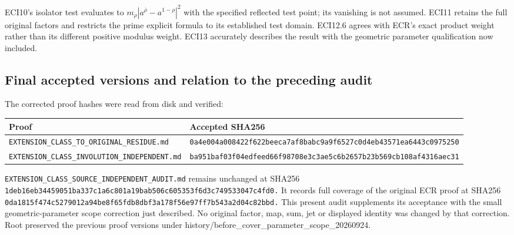 ECI10's isolator test evaluates to
\(m_\rho|a^{\overline\rho}-a^{1-\rho}|^2\) with the specified reflected
test point; its vanishing is not assumed. ECI11 retains the full
original factors and restricts the prime explicit formula to its
established test domain. ECI12.6 agrees with ECR's exact product weight
rather than its different positive modulus weight. ECI13 accurately
describes the result with the geometric parameter qualification now
included.

\subsection{Final accepted versions and relation to the preceding
audit}\label{final-accepted-versions-and-relation-to-the-preceding-audit}

The corrected proof hashes were read from disk and verified:

{\def\LTcaptype{none} %
\begin{longtable}[]{@{}
  >{\raggedright\arraybackslash}p{}
  >{\raggedright\arraybackslash}p{}@{}}
\toprule\noalign{}
\begin{minipage}[b]{\linewidth}\raggedright
Proof
\end{minipage} & \begin{minipage}[b]{\linewidth}\raggedright
Accepted SHA256
\end{minipage} \\
\midrule\noalign{}
\endhead
\bottomrule\noalign{}
\endlastfoot
\nolinkurl{EXTENSION_CLASS_TO_ORIGINAL_RESIDUE.md} &
\nolinkurl{0a4e004a008422f622beeca7af8babc9a9f6527c0d4eb43571ea6443c0975250} \\
\nolinkurl{EXTENSION_CLASS_INVOLUTION_INDEPENDENT.md} &
\nolinkurl{ba951baf03f04edfeed66f98708e3c3ae5c6b2657b23b569cb108af4316aec31} \\
\end{longtable}
}

\nolinkurl{EXTENSION_CLASS_SOURCE_INDEPENDENT_AUDIT.md} remains
unchanged at SHA256
\nolinkurl{1deb16eb34459051ba337c1a6c801a19bab506c605353f6d3c749533047c4fd0.}
It records full coverage of the original ECR proof at SHA256
\nolinkurl{0da1815f474c5279012a94be8f65fdb8dbf3a178f56e97ff7b543a2d04c82bbd.}
This present audit supplements its acceptance with the small
geometric-parameter scope correction just described. No original factor,
map, sum, jet or displayed identity was changed by that correction. Root
preserved the previous proof versions under
history/before\_cover\_parameter\_scope\_20260924.
